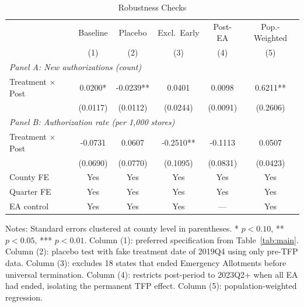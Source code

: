 \begin{table}[H]
\centering
\caption{Robustness Checks}
\label{tab:robustness}
\begin{threeparttable}
\begin{tabular}{lccccc}
\toprule
 & Baseline & Placebo & Excl.\ Early & Post-EA & Pop.-Weighted \\
 & (1) & (2) & (3) & (4) & (5) \\
\midrule
\multicolumn{6}{l}{\textit{Panel A: New authorizations (count)}} \\[3pt]
Treatment $\times$ Post & 0.0200* & -0.0239** & 0.0401 & 0.0098 & 0.6211** \\
 & (0.0117) & (0.0112) & (0.0244) & (0.0091) & (0.2606) \\
\midrule
\multicolumn{6}{l}{\textit{Panel B: Authorization rate (per 1,000 stores)}} \\[3pt]
Treatment $\times$ Post & -0.0731 & 0.0607 & -0.2510** & -0.1113 & 0.0507 \\
 & (0.0690) & (0.0770) & (0.1095) & (0.0831) & (0.0423) \\
\midrule
County FE & Yes & Yes & Yes & Yes & Yes \\
Quarter FE & Yes & Yes & Yes & Yes & Yes \\
EA control & Yes & Yes & Yes & --- & Yes \\
\bottomrule
\end{tabular}
\begin{tablenotes}[flushleft]
\small
\item Notes: Standard errors clustered at county level in parentheses. * $p<0.10$, ** $p<0.05$, *** $p<0.01$. Column (1): preferred specification from Table~\ref{tab:main}. Column (2): placebo test with fake treatment date of 2019Q4 using only pre-TFP data. Column (3): excludes 18 states that ended Emergency Allotments before universal termination. Column (4): restricts post-period to 2023Q2+ when all EA had ended, isolating the permanent TFP effect. Column (5): population-weighted regression.
\end{tablenotes}
\end{threeparttable}
\end{table}

